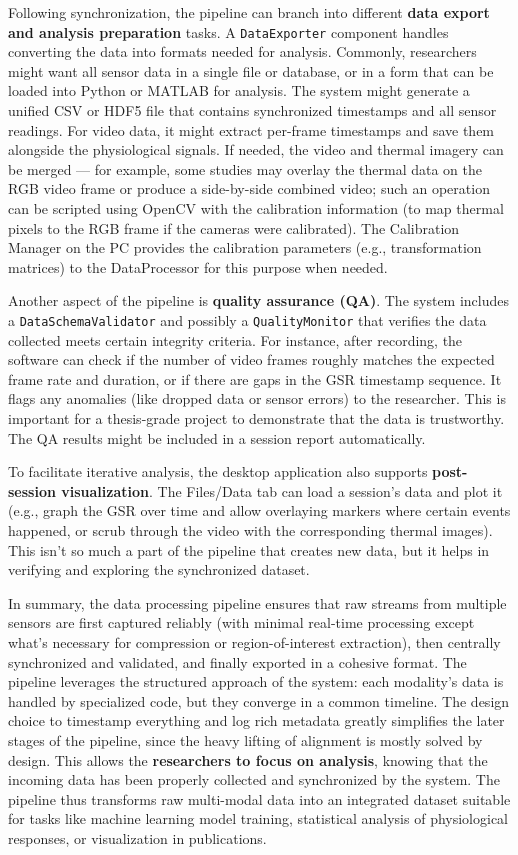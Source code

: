 \documentclass[11pt,a4paper]{report}
\begin{document}
Following synchronization, the pipeline can branch into different \textbf{data
export and analysis preparation} tasks. A \texttt{DataExporter} component
handles converting the data into formats needed for
analysis.
Commonly, researchers might want all sensor data in a single file or
database, or in a form that can be loaded into Python or MATLAB for
analysis. The system might generate a unified CSV or HDF5 file that
contains synchronized timestamps and all sensor readings. For video
data, it might extract per-frame timestamps and save them alongside the
physiological signals. If needed, the video and thermal imagery can be
merged --- for example, some studies may overlay the thermal data on the
RGB video frame or produce a side-by-side combined video; such an
operation can be scripted using OpenCV with the calibration information
(to map thermal pixels to the RGB frame if the cameras were calibrated).
The Calibration Manager on the PC provides the calibration parameters
(e.g., transformation matrices) to the DataProcessor for this purpose
when needed.

Another aspect of the pipeline is \textbf{quality assurance (QA)}. The system
includes a \texttt{DataSchemaValidator} and possibly a \texttt{QualityMonitor} that
verifies the data collected meets certain integrity
criteria.
For instance, after recording, the software can check if the number of
video frames roughly matches the expected frame rate and duration, or if
there are gaps in the GSR timestamp sequence. It flags any anomalies
(like dropped data or sensor errors) to the researcher. This is
important for a thesis-grade project to demonstrate that the data is
trustworthy. The QA results might be included in a session report
automatically.

To facilitate iterative analysis, the desktop application also supports
\textbf{post-session visualization}. The Files/Data tab can load a session's
data and plot it (e.g., graph the GSR over time and allow overlaying
markers where certain events happened, or scrub through the video with
the corresponding thermal images). This isn't so much a part of the
pipeline that creates new data, but it helps in verifying and exploring
the synchronized dataset.

In summary, the data processing pipeline ensures that raw streams from
multiple sensors are first captured reliably (with minimal real-time
processing except what's necessary for compression or region-of-interest
extraction), then centrally synchronized and validated, and finally
exported in a cohesive format. The pipeline leverages the structured
approach of the system: each modality's data is handled by specialized
code, but they converge in a common timeline. The design choice to
timestamp everything and log rich metadata greatly simplifies the later
stages of the pipeline, since the heavy lifting of alignment is mostly
solved by design. This allows the \textbf{researchers to focus on analysis},
knowing that the incoming data has been properly collected and
synchronized by the system. The pipeline thus transforms raw multi-modal
data into an integrated dataset suitable for tasks like machine learning
model training, statistical analysis of physiological responses, or
visualization in publications.
\end{document}
